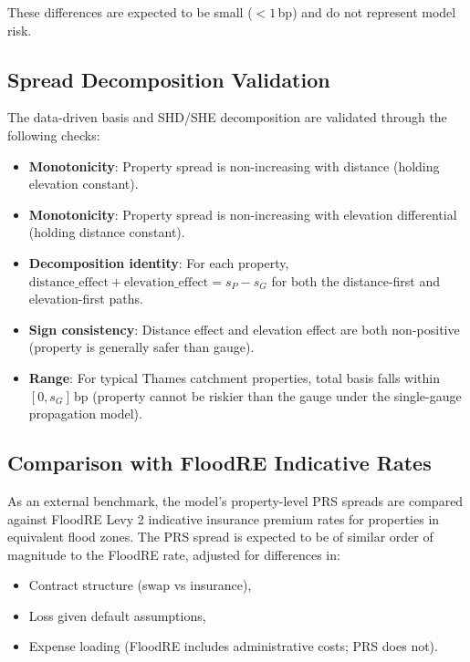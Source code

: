 \documentclass[11pt,a4paper]{article}
\begin{document}
These differences are expected to be small ($<1$\,bp) and do not represent model risk.

\subsection{Spread Decomposition Validation}

The data-driven basis and SHD/SHE decomposition are validated through the following
checks:

\begin{itemize}[nosep]
    \item \textbf{Monotonicity}: Property spread is non-increasing with distance
          (holding elevation constant).
    \item \textbf{Monotonicity}: Property spread is non-increasing with elevation
          differential (holding distance constant).
    \item \textbf{Decomposition identity}: For each property,
          $\text{distance\_effect} + \text{elevation\_effect} = s_P - s_G$ for both
          the distance-first and elevation-first paths.
    \item \textbf{Sign consistency}: Distance effect and elevation effect are both
          non-positive (property is generally safer than gauge).
    \item \textbf{Range}: For typical Thames catchment properties, total basis falls
          within $[0, s_G]$\,bp (property cannot be riskier than the gauge under
          the single-gauge propagation model).
\end{itemize}

\subsection{Comparison with FloodRE Indicative Rates}

As an external benchmark, the model's property-level PRS spreads are compared against
FloodRE Levy 2 indicative insurance premium rates for properties in equivalent flood
zones. The PRS spread is expected to be of similar order of magnitude to the FloodRE
rate, adjusted for differences in:

\begin{itemize}[nosep]
    \item Contract structure (swap vs insurance),
    \item Loss given default assumptions,
    \item Expense loading (FloodRE includes administrative costs; PRS does not).
\end{itemize}
\end{document}
